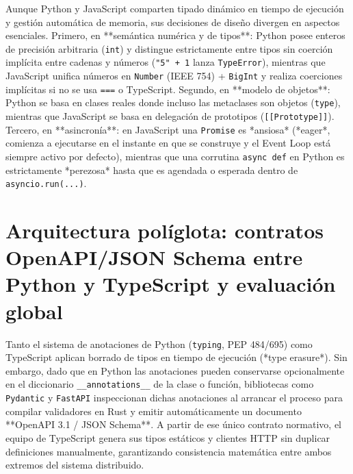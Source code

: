 \documentclass{book}
\begin{document}
Aunque Python y JavaScript comparten tipado dinámico en tiempo de ejecución y gestión automática de memoria, sus decisiones de diseño divergen en aspectos esenciales. Primero, en **semántica numérica y de tipos**: Python posee enteros de precisión arbitraria (\texttt{int}) y distingue estrictamente entre tipos sin coerción implícita entre cadenas y números (\texttt{"5" + 1} lanza \texttt{TypeError}), mientras que JavaScript unifica números en \texttt{Number} (IEEE 754) + \texttt{BigInt} y realiza coerciones implícitas si no se usa \texttt{===} o TypeScript. Segundo, en **modelo de objetos**: Python se basa en clases reales donde incluso las metaclases son objetos (\texttt{type}), mientras que JavaScript se basa en delegación de prototipos (\texttt{[[Prototype]]}). Tercero, en **asincronía**: en JavaScript una \texttt{Promise} es *ansiosa* (*eager*, comienza a ejecutarse en el instante en que se construye y el Event Loop está siempre activo por defecto), mientras que una corrutina \texttt{async def} en Python es estrictamente *perezosa* hasta que es agendada o esperada dentro de \texttt{asyncio.run(...)}.

\section{Arquitectura políglota: contratos OpenAPI/JSON Schema entre Python y TypeScript y evaluación global}

Tanto el sistema de anotaciones de Python (\texttt{typing}, PEP 484/695) como TypeScript aplican borrado de tipos en tiempo de ejecución (*type erasure*). Sin embargo, dado que en Python las anotaciones pueden conservarse opcionalmente en el diccionario \texttt{\_\_annotations\_\_} de la clase o función, bibliotecas como \texttt{Pydantic} y \texttt{FastAPI} inspeccionan dichas anotaciones al arrancar el proceso para compilar validadores en Rust y emitir automáticamente un documento **OpenAPI 3.1 / JSON Schema**. A partir de ese único contrato normativo, el equipo de TypeScript genera sus tipos estáticos y clientes HTTP sin duplicar definiciones manualmente, garantizando consistencia matemática entre ambos extremos del sistema distribuido.
\end{document}
